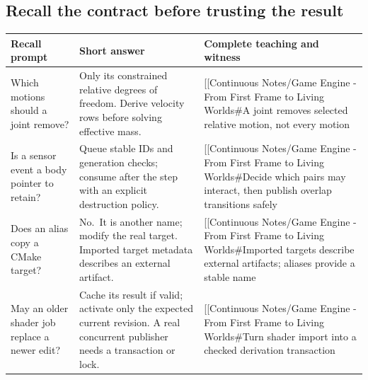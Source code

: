 \subsection{Recall the contract before trusting the result}\label{appendix-64ea716dcadc-recall-the-contract-before-trusting-the-result}

\hypertarget{appendix-64ea716dcadc-recall-the-contract-before-trusting-the-result}{}

{\def\LTcaptype{none} %
\begin{longtable}[]{@{}
  >{\raggedright\arraybackslash}p{}
  >{\raggedright\arraybackslash}p{}
  >{\raggedright\arraybackslash}p{}@{}}
\toprule\noalign{}
\begin{minipage}[b]{\linewidth}\raggedright
Recall prompt
\end{minipage} & \begin{minipage}[b]{\linewidth}\raggedright
Short answer
\end{minipage} & \begin{minipage}[b]{\linewidth}\raggedright
Complete teaching and witness
\end{minipage} \\
\midrule\noalign{}
\endhead
\bottomrule\noalign{}
\endlastfoot
Which motions should a joint remove? & Only its constrained relative degrees of freedom. Derive velocity rows before solving effective mass. & {[}{[}Continuous Notes/Game Engine - From First Frame to Living Worlds\#A joint removes selected relative motion, not every motion \\
Is a sensor event a body pointer to retain? & Queue stable IDs and generation checks; consume after the step with an explicit destruction policy. & {[}{[}Continuous Notes/Game Engine - From First Frame to Living Worlds\#Decide which pairs may interact, then publish overlap transitions safely \\
Does an alias copy a CMake target? & No.~It is another name; modify the real target. Imported target metadata describes an external artifact. & {[}{[}Continuous Notes/Game Engine - From First Frame to Living Worlds\#Imported targets describe external artifacts; aliases provide a stable name \\
May an older shader job replace a newer edit? & Cache its result if valid; activate only the expected current revision. A real concurrent publisher needs a transaction or lock. & {[}{[}Continuous Notes/Game Engine - From First Frame to Living Worlds\#Turn shader import into a checked derivation transaction \\
\end{longtable}
}
